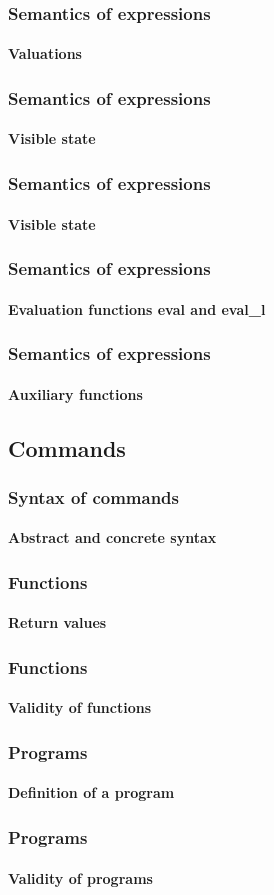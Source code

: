 \begin{frame}
\frametitle{Semantics of expressions}
\framesubtitle{Valuations}


\end{frame}


\begin{frame}
\frametitle{Semantics of expressions}
\framesubtitle{Visible state}


\end{frame}


\begin{frame}
\frametitle{Semantics of expressions}
\framesubtitle{Visible state}


\end{frame}


\begin{frame}
\frametitle{Semantics of expressions}
\framesubtitle{Evaluation functions eval and eval\_l}


\end{frame}


\begin{frame}
\frametitle{Semantics of expressions}
\framesubtitle{Auxiliary functions}


\end{frame}


\subsection{Commands}


\begin{frame}
\frametitle{Syntax of commands}
\framesubtitle{Abstract and concrete syntax}


\end{frame}


\begin{frame}
\frametitle{Functions}
\framesubtitle{Return values}


\end{frame}


\begin{frame}
\frametitle{Functions}
\framesubtitle{Validity of functions}


\end{frame}


\begin{frame}
\frametitle{Programs}
\framesubtitle{Definition of a program}


\end{frame}


\begin{frame}
\frametitle{Programs}
\framesubtitle{Validity of programs}


\end{frame}


